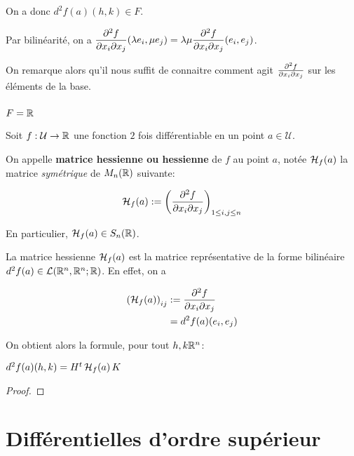 On a donc $\displaystyle d^{2}f(a)(h, k) \in F$.

Par bilinéarité, on a $\displaystyle \pdv{f}{x_{i}}{x_{j}} (a) (\lambda e_{i}, \mu
e_{j}) = \lambda \mu \pdv{f}{x_{i}}{x_{j}} (a) (e_{i}, e_{j})$.

On remarque alors qu'il nous suffit de connaitre comment agit
$\pdv{f}{x_{i}}{x_{j}} (a)$ sur les éléments de la base.

\subsubsection{$F = \mathbb{R}$}

Soit $f : \mathcal{U} \rightarrow \mathbb{R}$ une fonction $2$ fois différentiable
en un point $a \in \mathcal{U}$.

\begin{definition}
	On appelle \textbf{matrice hessienne ou hessienne} de $f$ au point $a$,
	notée $\mathcal{H}_{f}(a)$ la matrice \textit{symétrique} de
	$M_{n}(\mathbb{R})$ suivante:

	\begin{equation*}
		\mathcal{H}_{f}(a) := \displaystyle
		\left(\pdv{f}{x_{i}}{x_{j}} (a) \right)_{1
		\leq i, j \leq n}
	\end{equation*}

	En particulier, $\mathcal{H}_{f}(a) \in S_{n}(\mathbb{R})$.
\end{definition}

La matrice hessienne $\mathcal{H}_{f}(a)$ est la matrice représentative de
la forme bilinéaire $d^{2}f (a) \in \mathcal{L}(\mathbb{R}^{n},
\mathbb{R}^{n}; \mathbb{R})$.
En effet, on a

\begin{align*}
	\left(\mathcal{H}_{f}(a)\right)_{ij} & := \pdv{f}{x_{i}}{x_{j}} (a) \\
								& = d^{2}f (a) (e_{i}, e_{j})
\end{align*}

On obtient alors la formule, pour tout $h, k \mathbb{R}^{n}$:

\begin{proposition}
	$d^{2}f(a)(h, k) = H^{t} \, \mathcal{H}_{f}(a) \, K$
\end{proposition}

\ifdefined\outputproof
\begin{proof}

\end{proof}
\fi

\section{Différentielles d'ordre supérieur}

